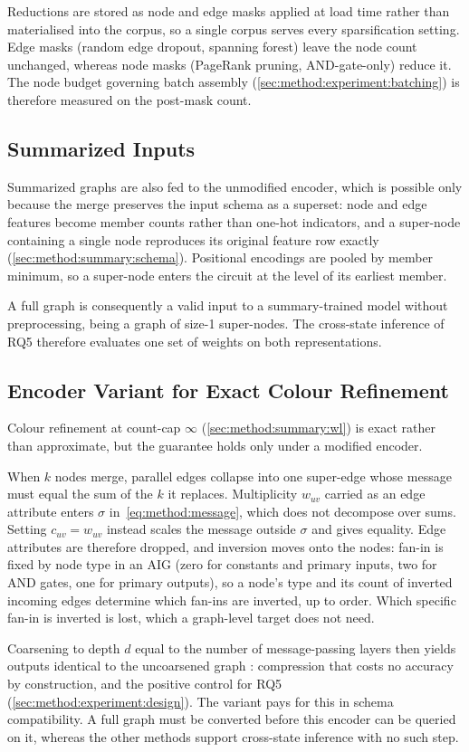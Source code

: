 Reductions are stored as node and edge masks applied at load time rather than materialised
into the corpus, so a single corpus serves every sparsification setting. Edge masks (random
edge dropout, spanning forest) leave the node count unchanged, whereas node masks (PageRank
pruning, AND-gate-only) reduce it. The node budget governing batch assembly
(\ref{sec:method:experiment:batching}) is therefore measured on the post-mask count.

\subsection{Summarized Inputs}
\label{sec:method:architecture:summarization}
Summarized graphs are also fed to the unmodified encoder, which is possible only because
the merge preserves the input schema as a superset: node and edge features become member
counts rather than one-hot indicators, and a super-node containing a single node reproduces
its original feature row exactly (\ref{sec:method:summary:schema}). Positional encodings are
pooled by member minimum, so a super-node enters the circuit at the level of its earliest
member.

A full graph is consequently a valid input to a summary-trained model without preprocessing,
being a graph of size-1 super-nodes. The cross-state inference of RQ5 therefore evaluates
one set of weights on both representations.

\subsection{Encoder Variant for Exact Colour Refinement}
\label{sec:method:architecture:exact}
Colour refinement at count-cap $\infty$ (\ref{sec:method:summary:wl}) is exact rather than
approximate, but the guarantee holds only under a modified encoder.

When $k$ nodes merge, parallel edges collapse into one super-edge whose message must equal
the sum of the $k$ it replaces. Multiplicity $w_{uv}$ carried as an edge attribute enters
$\sigma$ in~\eqref{eq:method:message}, which does not decompose over sums. Setting
$c_{uv} = w_{uv}$ instead scales the message outside $\sigma$ and gives equality. Edge
attributes are therefore dropped, and inversion moves onto the nodes: fan-in is fixed by
node type in an AIG (zero for constants and primary inputs, two for AND gates, one for
primary outputs), so a node's type and its count of inverted incoming edges determine which
fan-ins are inverted, up to order. Which specific fan-in is inverted is lost, which a
graph-level target does not need.

Coarsening to depth $d$ equal to the number of message-passing layers then yields outputs
identical to the uncoarsened graph \citep{bollen2023exact}: compression that costs no
accuracy by construction, and the positive control for RQ5
(\ref{sec:method:experiment:design}). The variant pays for this in schema compatibility. A
full graph must be converted before this encoder can be queried on it, whereas the other
methods support cross-state inference with no such step.
